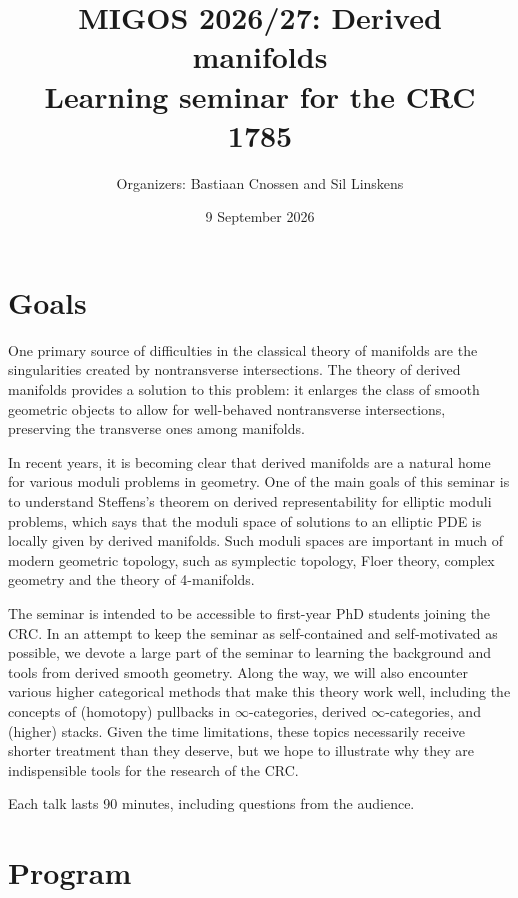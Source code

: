 \documentclass[11pt,a4paper]{article}
\title{MIGOS 2026/27: Derived manifolds\\\large Learning seminar for the CRC 1785}
\author{Organizers: Bastiaan Cnossen and Sil Linskens}
\date{9 September 2026}
\begin{document}
\maketitle
	
\section*{Goals}

One primary source of difficulties in the classical theory of manifolds are the singularities created by nontransverse intersections. The theory of derived manifolds provides a solution to this problem: it enlarges the class of smooth geometric objects to allow for well-behaved nontransverse intersections, preserving the transverse ones among manifolds.

In recent years, it is becoming clear that derived manifolds are a natural home for various moduli problems in geometry. One of the main goals of this seminar is to understand Steffens's theorem on derived representability for elliptic moduli problems, which says that the moduli space of solutions to an elliptic PDE is locally given by derived manifolds. Such moduli spaces are important in much of modern geometric topology, such as symplectic topology, Floer theory, complex geometry and the theory of 4-manifolds.

The seminar is intended to be accessible to first-year PhD students joining the CRC. In an attempt to keep the seminar as self-contained and self-motivated as possible, we devote a large part of the seminar to learning the background and tools from derived smooth geometry. Along the way, we will also encounter various higher categorical methods that make this theory work well, including the concepts of (homotopy) pullbacks in $\infty$-categories, derived $\infty$-categories, and (higher) stacks. Given the time limitations, these topics necessarily receive shorter treatment than they deserve, but we hope to illustrate why they are indispensible tools for the research of the CRC.

Each talk lasts 90 minutes, including questions from the audience.

\section*{Program}
\end{document}
